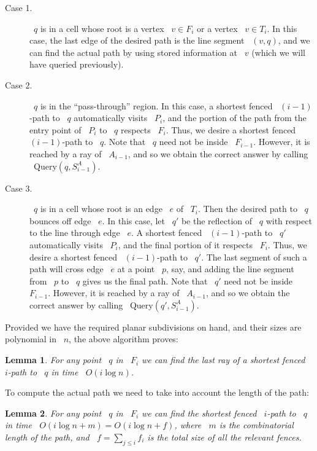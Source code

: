 \documentclass[11pt]{article}
\newtheorem{lemma}{Lemma}
\begin{document}
\begin{description}
	\item[Case 1.] ~\(q\) is in a cell whose root is a vertex ~\(v \in F_i\) or a vertex ~\(v \in T_i\). In this case, the last edge of the desired path is the line segment ~\((v, q)\), and we can find the actual path by using stored information at ~\(v\) (which we will have queried previously).
	\item[Case 2.] ~\(q\) is in the ``pass-through'' region. In this case, a shortest fenced ~\((i-1)\)-path to ~\(q\) automatically visits ~\(P_i\), and the portion of the path from the entry point of ~\(P_i\) to ~\(q\) respects ~\(F_i\). Thus, we desire a shortest fenced ~\((i-1)\)-path to ~\(q\). Note that ~\(q\) need not be inside ~\(F_{i-1}\). However, it is reached by a ray of ~\(A_{i-1}\), and so we obtain the correct answer by calling ~\(\text{Query}(q, S_{i-1}^A)\).
	\item[Case 3.] ~\(q\) is in a cell whose root is an edge ~\(e\) of ~\(T_i\). Then the desired path to ~\(q\) bounces off edge ~\(e\). In this case, let ~\(q'\) be the reflection of ~\(q\) with respect to the line through edge ~\(e\). A shortest fenced ~\((i-1)\)-path to ~\(q'\) automatically visits ~\(P_i\), and the final portion of it respects ~\(F_i\). Thus, we desire a shortest fenced ~\((i-1)\)-path to ~\(q'\). The last segment of such a path will cross edge ~\(e\) at a point ~\(p\), say, and adding the line segment from ~\(p\) to ~\(q\) gives us the final path. Note that ~\(q'\) need not be inside ~\(F_{i-1}\). However, it is reached by a ray of ~\(A_{i-1}\), and so we obtain the correct answer by calling ~\(\text{Query}(q', S_{i-1}^A)\).
\end{description}

Provided we have the required planar subdivisions on hand, and their sizes are polynomial in ~\(n\), the above algorithm proves:

\begin{lemma}
\label{lem:queryO}
For any point ~\(q\) in ~\(F_i\) we can find the last ray of a shortest fenced ~\(i\)-path to ~\(q\) in time ~\(O(i\log n)\).
\end{lemma}

To compute the actual path we need to take into account the length of the path:

\begin{lemma}
\label{lem:queryOm}
For any point ~\(q\) in ~\(F_i\) we can find the shortest fenced ~\(i\)-path to ~\(q\) in time ~\(O(i\log n + m) = O(i\log n + f)\), where ~\(m\) is the combinatorial length of the path, and ~\(f = \sum_{j \le i} f_i\) is the total size of all the relevant fences.
\end{lemma}
\end{document}
